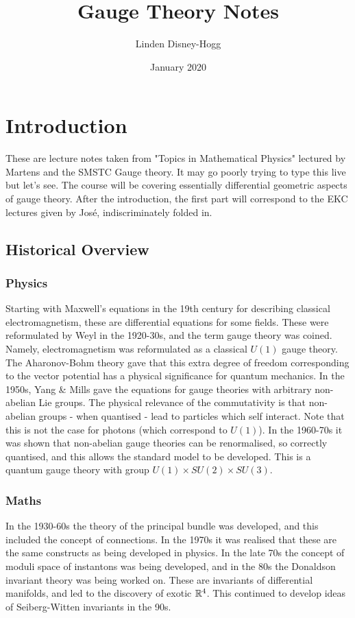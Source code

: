 \documentclass{article}
\title{Gauge Theory Notes}
\author{Linden Disney-Hogg}
\date{January 2020}
\begin{document}
\maketitle
\tableofcontents

\section{Introduction}
These are lecture notes taken from "Topics in Mathematical Physics" lectured by Martens and the SMSTC Gauge theory. It may go poorly trying to type this live but let's see. The course will be covering essentially differential geometric aspects of gauge theory. After the introduction, the first part will correspond to the EKC lectures given by Jos\'{e}, indiscriminately folded in.  
\subsection{Historical Overview}
\subsubsection{Physics}
Starting with Maxwell's equations in the 19th century for describing classical electromagnetism, these are differential equations for some fields. These were reformulated by Weyl in the 1920-30s, and the term gauge theory was coined. Namely, electromagnetism was reformulated as a classical $U(1)$ gauge theory. The Aharonov-Bohm theory gave that this extra degree of freedom corresponding to the vector potential has a physical significance for quantum mechanics. In the 1950s, Yang \& Mills gave the equations for gauge theories with arbitrary non-abelian Lie groups. The physical relevance of the commutativity is that non-abelian groups - when quantised - lead to particles which self interact. Note that this is not the case for photons (which correspond to $U(1)$). In the 1960-70s it was shown that non-abelian gauge theories can be renormalised, so correctly quantised, and this allows the standard model to be developed. This is a quantum gauge theory with group $U(1)\times SU(2) \times SU(3)$.

\subsubsection{Maths}
In the 1930-60s the theory of the principal bundle was developed, and this included the concept of connections. In the 1970s it was realised that these are the same constructs as being developed in physics. In the late 70s the concept of moduli space of instantons was being developed, and in the 80s the Donaldson invariant theory was being worked on. These are invariants of differential manifolds, and led to the discovery of exotic $\mathbb{R}^4$. This continued to develop ideas of Seiberg-Witten invariants in the 90s. 
\end{document}
